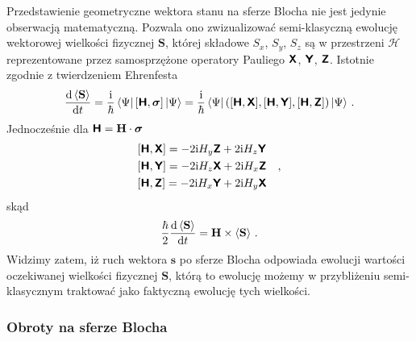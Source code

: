 \documentclass{myclass}
\begin{document}
Przedstawienie geometryczne wektora stanu na sferze Blocha nie jest jedynie obserwacją matematyczną.
Pozwala ono zwizualizować semi-klasyczną ewolucję wektorowej wielkości fizycznej \(\mathbf{S}\),
której składowe \(S_x\), \(S_y\), \(S_z\) są w przestrzeni \(\mathscr{H}\) reprezentowane przez
samosprzężone operatory Pauliego \(\boldsymbol{\mathsf{X}}\), \(\boldsymbol{\mathsf{Y}}\), \(\boldsymbol{\mathsf{Z}}\). Istotnie zgodnie z
twierdzeniem Ehrenfesta
\begin{equation*}
    \dv{\expval{\mathbf{S}}}{t} = \frac{\mathrm{i}}{\hbar}\bra{\Psi}[\boldsymbol{\mathsf{H}}, \boldsymbol{\sigma}]\ket{\Psi} = \frac{\mathrm{i}}{\hbar}\bra{\Psi}\left([\boldsymbol{\mathsf{H}},\boldsymbol{\mathsf{X}}],[\boldsymbol{\mathsf{H}},\boldsymbol{\mathsf{Y}}],[\boldsymbol{\mathsf{H}},\boldsymbol{\mathsf{Z}}]\right)\ket{\Psi}\,.
\end{equation*}
Jednocześnie dla \(\boldsymbol{\mathsf{H}} = \mathbf{H}\cdot\boldsymbol{\sigma}\)
\begin{equation*}
    \begin{split}
        &[\boldsymbol{\mathsf{H}},\boldsymbol{\mathsf{X}}] = -2\mathrm{i} H_y\boldsymbol{\mathsf{Z}} + 2\mathrm{i} H_z \boldsymbol{\mathsf{Y}}\\
        &[\boldsymbol{\mathsf{H}},\boldsymbol{\mathsf{Y}}] = -2\mathrm{i} H_z\boldsymbol{\mathsf{X}} + 2\mathrm{i} H_x \boldsymbol{\mathsf{Z}}\\
        &[\boldsymbol{\mathsf{H}},\boldsymbol{\mathsf{Z}}] = -2\mathrm{i} H_x\boldsymbol{\mathsf{Y}} + 2\mathrm{i} H_y \boldsymbol{\mathsf{X}}
    \end{split}\quad,
\end{equation*}
skąd
\begin{equation*}
    \frac{\hbar}{2}\dv{\expval{\mathbf{S}}}{t} = \mathbf{H} \times \expval{\mathbf{S}}\,.
\end{equation*}
Widzimy zatem, iż ruch wektora \(\mathbf{s}\) po sferze Blocha odpowiada ewolucji wartości
oczekiwanej wielkości fizycznej \(\mathbf{S}\), którą to ewolucję możemy w przybliżeniu
semi-klasycznym traktować jako faktyczną ewolucję tych wielkości.

\subsubsection{Obroty na sferze Blocha}
\end{document}
